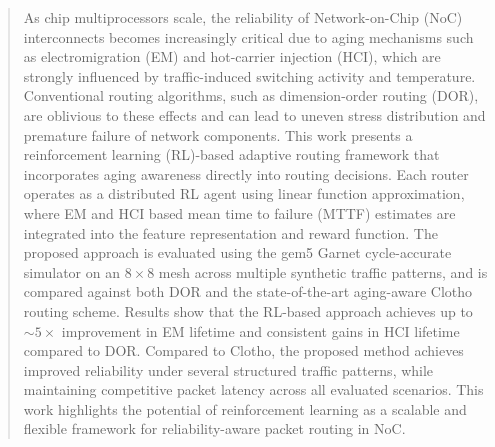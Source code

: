 \documentclass[basc,oneside]{ubcthesis}
\begin{document}
\begin{abstract}                %

As chip multiprocessors scale, the reliability of Network-on-Chip (NoC) interconnects becomes increasingly critical due to aging mechanisms such as electromigration (EM) and hot-carrier injection (HCI), which are strongly influenced by traffic-induced switching activity and temperature. Conventional routing algorithms, such as dimension-order routing (DOR), are oblivious to these effects and can lead to uneven stress distribution and premature failure of network components. This work presents a reinforcement learning (RL)-based adaptive routing framework that incorporates aging awareness directly into routing decisions. Each router operates as a distributed RL agent using linear function approximation, where EM and HCI based mean time to failure (MTTF) estimates are integrated into the feature representation and reward function. The proposed approach is evaluated using the gem5 Garnet cycle-accurate simulator on an $8 \times 8$ mesh across multiple synthetic traffic patterns, and is compared against both DOR and the state-of-the-art aging-aware Clotho routing scheme. Results show that the RL-based approach achieves up to $\sim5\times$ improvement in EM lifetime and consistent gains in HCI lifetime compared to DOR. Compared to Clotho, the proposed method achieves improved reliability under several structured traffic patterns, while maintaining competitive packet latency across all evaluated scenarios. This work highlights the potential of reinforcement learning as a scalable and flexible framework for reliability-aware packet routing in NoC.

\end{abstract}

\tableofcontents                %
\listoffigures                  %

\mainmatter
\end{document}
